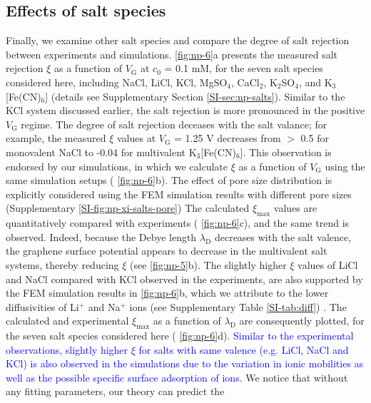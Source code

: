 \subsection{Effects of salt species}
\label{sec:np-salts}

Finally, we examine other salt species and compare the degree of salt
rejection between experiments and simulations.  \autoref{fig:np-6}a
presents the measured salt rejection $\xi$ as a function of
$V_{\mathrm{G}}$ at $c_{0}$ = 0.1 mM, for the seven salt species
considered here, including NaCl, LiCl, KCl, MgSO$_{4}$, CaCl$_{2}$,
K$_{2}$SO$_{4}$, and K$_{3}$[Fe(CN)$_{6}$] (details see Supplementary
Section \autoref{SI-sec:np-salts}). Similar to the KCl system discussed
earlier, the salt rejection is more pronounced in the positive
$V_{\mathrm{G}}$ regime.
%
The degree of salt rejection deceases with the salt valance; for
example, the measured $\xi$ values at $V_{\mathrm{G}}$ = 1.25 V
decreases from $>$ 0.5 for monovalent NaCl to -0.04 for multivalent
K$_{3}$[Fe(CN)$_{6}$]. This observation is endorsed by our
simulations, in which we calculate $\xi$ as a function of
$V_{\mathrm{G}}$ using the same simulation setups (
\autoref{fig:np-6}b).  { The effect of pore size distribution is explicitly
  considered using the FEM simulation results with different pore
  sizes (Supplementary  \autoref{SI-fig:np-xi-salts-pore})} The
calculated $\xi_{\mathrm{max}}$ values are quantitatively compared
with experiments ( \autoref{fig:np-6}c), and the same trend is
observed. Indeed, because the Debye length $\lambda_{\mathrm{D}}$
decreases with the salt valence, the graphene surface potential
appears to decrease in the multivalent salt systems, thereby reducing
$\xi$ (see  \autoref{fig:np-5}b).  { The slightly higher $\xi$ values
  of LiCl and NaCl compared with KCl observed in the experiments, are
  also supported by the FEM simulation results in  \autoref{fig:np-6}b,
  which we attribute to the lower diffusivities of Li$^{+}$ and
  Na$^{+}$ ions (see Supplementary Table \autoref{SI-tab:diff}) }.  The
calculated and experimental $\xi_{\mathrm{max}}$ as a function of
$\lambda_{\mathrm{D}}$ are consequently plotted, for the seven salt
species considered here ( \autoref{fig:np-6}d).  \textcolor{blue}{
  Similar to the experimental observations, slightly higher $\xi$ for
  salts with same valence (e.g. LiCl, NaCl and KCl) is also observed
  in the simulations due to the variation in ionic mobilities as well
  as the possible specific surface adsorption of ions.} We notice that
without any fitting parameters, our theory can predict the
